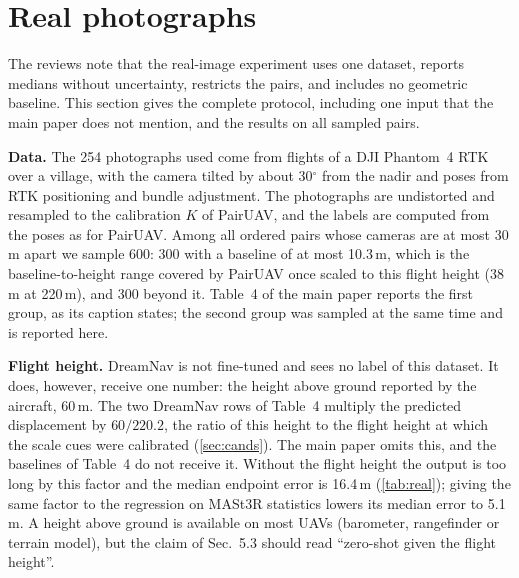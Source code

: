 \documentclass[10pt,twocolumn,letterpaper]{article}
\begin{document}
\section{Real photographs}
\label{sec:real}

The reviews note that the real-image experiment uses one dataset, reports medians without uncertainty, restricts the pairs, and includes no geometric baseline. This section gives the complete protocol, including one input that the main paper does not mention, and the results on all sampled pairs.

\noindent\textbf{Data.} The 254 photographs used come from flights of a DJI Phantom~4 RTK over a village, with the camera tilted by about 30$^\circ$ from the nadir and poses from RTK positioning and bundle adjustment. The photographs are undistorted and resampled to the calibration $K$ of PairUAV, and the labels are computed from the poses as for PairUAV. Among all ordered pairs whose cameras are at most 30\,m apart we sample 600: 300 with a baseline of at most 10.3\,m, which is the baseline-to-height range covered by PairUAV once scaled to this flight height (38\,m at 220\,m), and 300 beyond it. Table~4 of the main paper reports the first group, as its caption states; the second group was sampled at the same time and is reported here.

\noindent\textbf{Flight height.} DreamNav is not fine-tuned and sees no label of this dataset. It does, however, receive one number: the height above ground reported by the aircraft, 60\,m. The two DreamNav rows of Table~4 multiply the predicted displacement by $60/220.2$, the ratio of this height to the flight height at which the scale cues were calibrated (\cref{sec:cands}). The main paper omits this, and the baselines of Table~4 do not receive it. Without the flight height the output is too long by this factor and the median endpoint error is 16.4\,m (\cref{tab:real}); giving the same factor to the regression on MASt3R statistics lowers its median error to 5.1\,m. A height above ground is available on most UAVs (barometer, rangefinder or terrain model), but the claim of Sec.~5.3 should read ``zero-shot given the flight height''.
\end{document}
